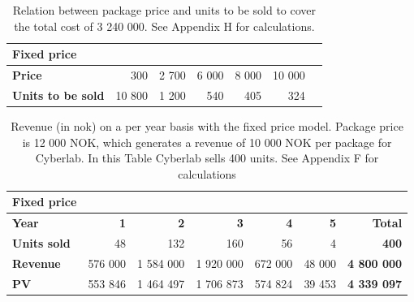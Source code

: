 \begin{table}
\centering
\caption[Price and Unit examples with the fixed price model]{Relation between package price and units to be sold to cover the total cost of 3 240 000. See Appendix H for calculations.}
    \begin{tabular}{|l|r|r|r|r|r|r|}
        \hline
       \textbf{Fixed price}  & & & & & \\ \hline
      \textbf{Price} & 300 & 2 700 & 6 000 & 8 000 & 10 000 \\ \hline
	   \textbf{Units to be sold} & 10 800 & 1 200 & 540 & 405 & 324 \\ \hline	
    \end{tabular}
    \label{tab:unitsfixed}
\end{table}
\begin{table}
\caption[Revenue with use of Fixed Price Model]{Revenue (in \ac{nok}) on a per year basis with the fixed price model. Package price is 12 000 NOK, which generates a revenue of 10 000 NOK per package for Cyberlab. In this Table Cyberlab sells 400 units. See Appendix F for calculations}
    \begin{tabular}{|l|r|r|r|r|r|r|}
        \hline
       \textbf{Fixed price}  & & & & & & \\ \hline
      \textbf{Year} & \textbf{1} & \textbf{2} & \textbf{3} & \textbf{4} & \textbf{5} & \textbf{Total}\\ \hline
	   \textbf{Units sold} & 48 & 132 & 160 & 56 & 4 & \textbf{400}\\ \hline
	   \textbf{Revenue} & 576 000 & 1 584 000 & 1 920 000 & 672 000 & 48 000 & \textbf{4 800 000} \\ \hline  
	   \textbf{PV} & 553 846 & 1 464 497 & 1 706 873 & 574 824 & 39 453 & \textbf{4 339 097}  \\ \hline
    \end{tabular}
    \label{tab:revfixed}
\end{table}

